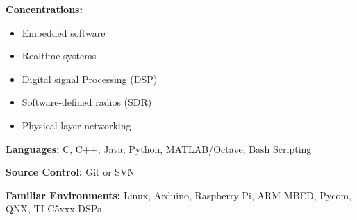 
\raggedright

\textbf{Concentrations:}
\begin{itemize}[leftmargin=*,noitemsep,topsep=0pt,parsep=0pt,partopsep=0pt]
    \item Embedded software
    \item Realtime systems
    \item Digital signal Processing (DSP)
    \item Software-defined radios (SDR)
    \item Physical layer networking
\end{itemize}
\smallskip

\textbf{Languages:}
\newline
C, C++, Java, Python, MATLAB/Octave, Bash Scripting
\smallskip

\textbf{Source Control:}
\newline
Git or SVN
\smallskip

\textbf{Familiar Environments:}
\newline
Linux, Arduino, Raspberry Pi, ARM MBED, Pycom, QNX, TI C5xxx DSPs
\smallskip
